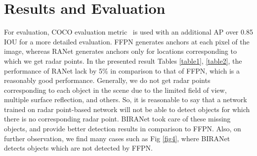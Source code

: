 \documentclass{article}
\begin{document}
\section{Results and Evaluation}
\label{sec:eval}
For evaluation, COCO evaluation metric~\cite{lin2014microsoft} is used with an additional AP over 0.85 IOU for a more detailed evaluation. FFPN generates anchors at each pixel of the image, whereas RANet generates anchors only for locations corresponding to which we get radar points. In the presented result Tables \ref{table1}, \ref{table2}, the performance of RANet lack by 5\% in comparison to that of FFPN, which is a reasonably good performance. Generally, we do not get radar points corresponding to each object in the scene due to the limited field of view, multiple surface reflection, and others. So, it is reasonable to say that a network trained on radar point-based network will not be able to detect objects for which there is no corresponding radar point. BIRANet took care of these missing objects, and provide better detection results in comparison to FFPN. Also, on further observation, we find many cases such as Fig \ref{fig4}, where BIRANet detects objects which are not detected by FFPN.

\begin{table}[htbp]
\caption{Comparison of detection results on 1024x1024 image size.}
\label{table1}
\end{table}
\end{document}

